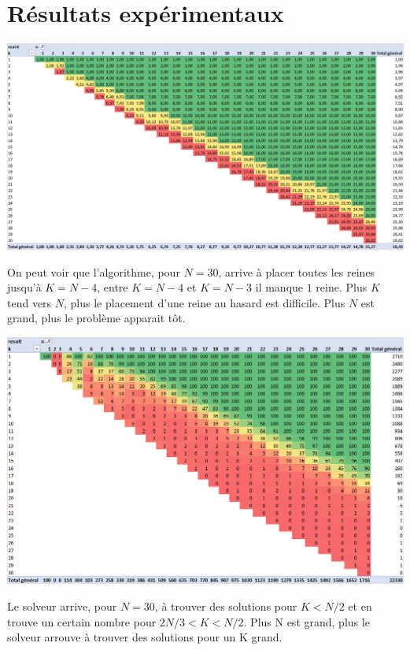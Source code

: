 \documentclass[a4paper, 10pt]{article}
\begin{document}
		\newpage
		\section{Résultats expérimentaux}
			\begin{center} \includegraphics[width=\textwidth]{realK30.png} \end{center}

            On peut voir que l'algorithme, pour $N=30$, arrive à placer toutes les reines jusqu'à $K=N-4$, entre $K=N-4$ et $K=N-3$ il manque $1$ reine. Plus $K$ tend vers $N$, plus le placement d'une reine au hasard est difficile. Plus $N$ est grand, plus le problème apparait tôt.

			\begin{center} \includegraphics[width=\textwidth]{result30.png} \end{center}

            Le solveur arrive, pour $N=30$, à trouver des solutions pour $K<N/2$ et en trouve un certain nombre pour $2N/3<K<N/2$. Plus N est grand, plus le solveur arrouve à trouver des solutions pour un K grand.
\end{document}
